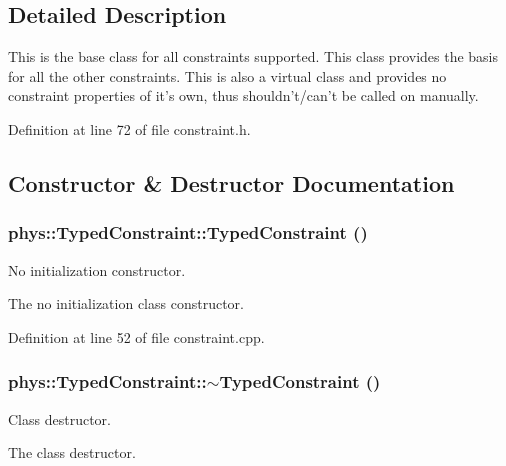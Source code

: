 \subsection{Detailed Description}
This is the base class for all constraints supported. This class provides the basis for all the other constraints. This is also a virtual class and provides no constraint properties of it's own, thus shouldn't/can't be called on manually. 

Definition at line 72 of file constraint.h.



\subsection{Constructor \& Destructor Documentation}
\hypertarget{classphys_1_1TypedConstraint_a499e2f94ca4ee111001efa0dd3862391}{
\subsubsection[{TypedConstraint}]{\setlength{\rightskip}{0pt plus 5cm}phys::TypedConstraint::TypedConstraint ()}}
\label{d1/d17/classphys_1_1TypedConstraint_a499e2f94ca4ee111001efa0dd3862391}


No initialization constructor. 

The no initialization class constructor. 

Definition at line 52 of file constraint.cpp.

\hypertarget{classphys_1_1TypedConstraint_abf1cb6e3cf5c62feac31805162ec2766}{
\subsubsection[{$\sim$TypedConstraint}]{\setlength{\rightskip}{0pt plus 5cm}phys::TypedConstraint::$\sim$TypedConstraint ()}}
\label{d1/d17/classphys_1_1TypedConstraint_abf1cb6e3cf5c62feac31805162ec2766}


Class destructor. 

The class destructor. 

